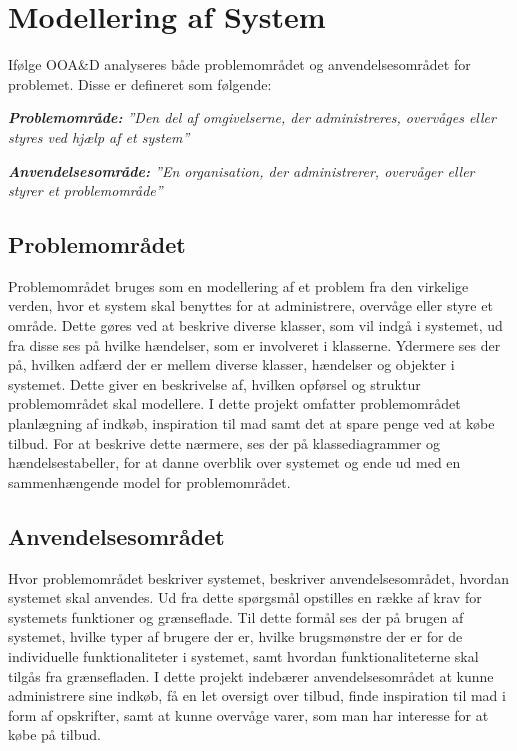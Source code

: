 \section{Modellering af System}
Ifølge OOA\&D analyseres både problemområdet og anvendelsesområdet for problemet\cite[s. 6]{OOA&D2001}.
Disse er defineret som følgende:

\textit{\textbf{Problemområde:} ''Den del af omgivelserne, der administreres, overvåges eller styres ved hjælp af et system''}

\textit{\textbf{Anvendelsesområde:} ''En organisation, der administrerer, overvåger eller styrer et problemområde''}

\subsection{Problemområdet}
Problemområdet bruges som en modellering af et problem fra den virkelige verden, hvor et system skal benyttes for at administrere, overvåge eller styre et område. 
Dette gøres ved at beskrive diverse klasser, som vil indgå i systemet, ud fra disse ses på hvilke hændelser, som er involveret i klasserne.
Ydermere ses der på, hvilken adfærd der er mellem diverse klasser, hændelser og objekter i systemet.
Dette giver en beskrivelse af, hvilken opførsel og struktur problemområdet skal modellere.
I dette projekt omfatter problemområdet planlægning af indkøb, inspiration til mad samt det at spare penge ved at købe tilbud.
For at beskrive dette nærmere, ses der på klassediagrammer og hændelsestabeller, for at danne overblik over systemet og ende ud med en sammenhængende model for problemområdet.
\subsection{Anvendelsesområdet}
Hvor problemområdet beskriver systemet, beskriver anvendelsesområdet, hvordan systemet skal anvendes.
Ud fra dette spørgsmål opstilles en række af krav for systemets funktioner og grænseflade.
Til dette formål ses der på brugen af systemet, hvilke typer af brugere der er, hvilke brugsmønstre der er for de individuelle funktionaliteter i systemet, samt hvordan funktionaliteterne skal tilgås fra grænsefladen.
I dette projekt indebærer anvendelsesområdet at kunne administrere sine indkøb, få en let oversigt over tilbud, finde inspiration til mad i form af opskrifter, samt at kunne overvåge varer, som man har interesse for at købe på tilbud.

